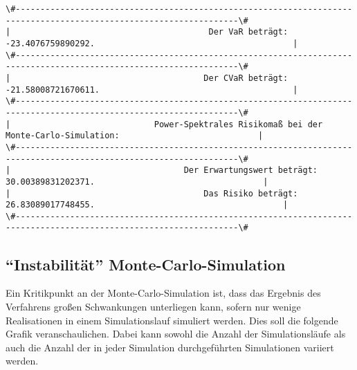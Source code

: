 \documentclass[paper=landscape]{scrartcl}
\begin{document}
    \begin{Verbatim}[commandchars=\\\{\}]
\#-------------------------------------------------------------------------------------------------------------------\#
|                                        Der VaR beträgt: -23.4076759890292.                                        | 
\#-------------------------------------------------------------------------------------------------------------------\#
|                                       Der CVaR beträgt: -21.58008721670611.                                       | 
\#-------------------------------------------------------------------------------------------------------------------\#
|                             Power-Spektrales Risikomaß bei der Monte-Carlo-Simulation:                            | 
\#-------------------------------------------------------------------------------------------------------------------\#
|                                   Der Erwartungswert beträgt: 30.00389831202371.                                  | 
|                                       Das Risiko beträgt: 26.83089017748455.                                      | 
\#-------------------------------------------------------------------------------------------------------------------\#

    \end{Verbatim}

    \hypertarget{instabilituxe4t-monte-carlo-simulation}{%
\subsection{``Instabilität''
Monte-Carlo-Simulation}\label{instabilituxe4t-monte-carlo-simulation}}

Ein Kritikpunkt an der Monte-Carlo-Simulation ist, dass das Ergebnis des
Verfahrens großen Schwankungen unterliegen kann, sofern nur wenige
Realisationen in einem Simulationslauf simuliert werden. Dies soll die
folgende Grafik veranschaulichen. Dabei kann sowohl die Anzahl der
Simulationsläufe als auch die Anzahl der in jeder Simulation
durchgeführten Simulationen variiert werden.
\end{document}
